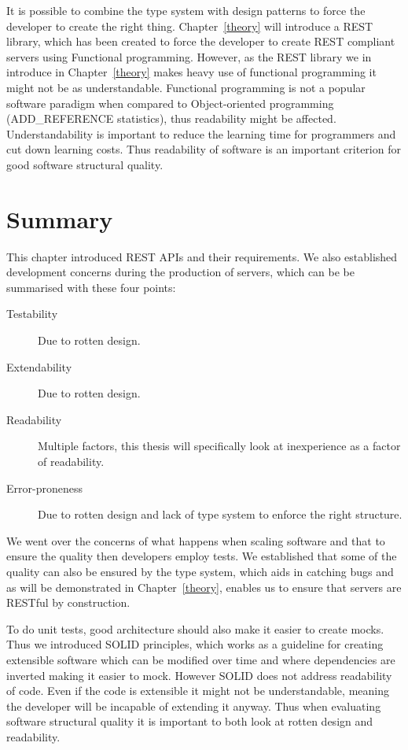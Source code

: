 It is possible to combine the type system with design patterns to force the
developer to create the right thing. Chapter~\ref{theory} will introduce a REST
library, which has been created to force the developer to create REST compliant
servers using Functional programming. However, as the REST library we in
introduce in Chapter~\ref{theory} makes heavy use of functional programming it
might not be as understandable.  Functional programming is not a popular
software paradigm when compared to Object-oriented programming (ADD\_REFERENCE
statistics), thus readability might be affected.  Understandability is important
to reduce the learning time for programmers and cut down learning costs. Thus
readability of software is an important criterion for good software structural
quality.

\section{Summary}\label{backgroundconclusion}

This chapter introduced REST APIs and their requirements.  We also established
development concerns during the production of servers, which can be be
summarised with these four points:

\begin{description}
    \item[Testability] Due to rotten design.
    \item[Extendability] Due to rotten design.
    \item[Readability] Multiple factors, this thesis will specifically look at 
		inexperience as a factor of readability.
    \item[Error-proneness] Due to rotten design and lack of type system to
        enforce the right structure.
\end{description}

We went over the concerns of what happens when scaling software and that to
ensure the quality then developers employ tests. We established that some of the
quality can also be ensured by the type system, which aids in catching bugs and
as will be demonstrated in Chapter~\ref{theory}, enables us to ensure that
servers are RESTful by construction. 

To do unit tests, good architecture should also make it easier to create mocks.
Thus we introduced SOLID principles, which works as a guideline for creating
extensible software which can be modified over time and where dependencies are
inverted making it easier to mock. However SOLID does not address readability of
code. Even if the code is extensible it might not be understandable, meaning the
developer will be incapable of extending it anyway.  Thus when evaluating
software structural quality it is important to both look at rotten design and
readability.
